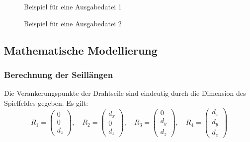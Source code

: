 \begin{figure}[H]
    \centering
    
    \caption{Beispiel für eine Ausgabedatei 1}
    \label{fig:example_output_1}
\end{figure}

\begin{figure}[H]
    \centering
    
    \caption{Beispiel für eine Ausgabedatei 2}
    \label{fig:example_output_2}
\end{figure}






\subsection{Mathematische Modellierung}
\label{ssec:mathematische_modellierung}

\subsubsection{Berechnung der Seillängen}
\label{sssec:berechnung_der_seillaengen}

Die Verankerungspunkte der Drahtseile sind eindeutig durch die Dimension des Spielfeldes gegeben.
Es gilt:
\[
    R_1 = \begin{pmatrix}
        0 \\ 0 \\ d_z
    \end{pmatrix},
    \quad
    R_2 = \begin{pmatrix}
        d_x \\ 0 \\ d_z
    \end{pmatrix},
    \quad
    R_3 = \begin{pmatrix}
        0 \\ d_y \\ d_z
    \end{pmatrix},
    \quad
    R_4 = \begin{pmatrix}
        d_x \\ d_y \\ d_z
    \end{pmatrix}
\]

